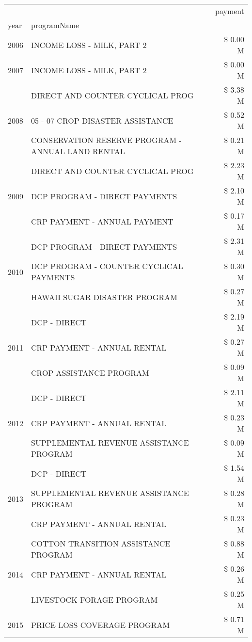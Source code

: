 \begin{tabular}{llr}
\toprule
 &  & payment \\
year & programName &  \\
\midrule
2006 & INCOME LOSS - MILK, PART 2 & \$ 0.00 M \\
\cline{1-3}
2007 & INCOME LOSS - MILK, PART 2 & \$ 0.00 M \\
\cline{1-3}
\multirow[t]{3}{*}{2008} & DIRECT AND COUNTER CYCLICAL PROG & \$ 3.38 M \\
 & 05 - 07 CROP DISASTER ASSISTANCE & \$ 0.52 M \\
 & CONSERVATION RESERVE PROGRAM - ANNUAL LAND RENTAL & \$ 0.21 M \\
\cline{1-3}
\multirow[t]{3}{*}{2009} & DIRECT AND COUNTER CYCLICAL PROG & \$ 2.23 M \\
 & DCP PROGRAM - DIRECT PAYMENTS & \$ 2.10 M \\
 & CRP PAYMENT - ANNUAL PAYMENT & \$ 0.17 M \\
\cline{1-3}
\multirow[t]{3}{*}{2010} & DCP PROGRAM - DIRECT PAYMENTS & \$ 2.31 M \\
 & DCP PROGRAM - COUNTER CYCLICAL PAYMENTS & \$ 0.30 M \\
 & HAWAII SUGAR DISASTER PROGRAM & \$ 0.27 M \\
\cline{1-3}
\multirow[t]{3}{*}{2011} & DCP - DIRECT & \$ 2.19 M \\
 & CRP PAYMENT - ANNUAL RENTAL & \$ 0.27 M \\
 & CROP ASSISTANCE PROGRAM & \$ 0.09 M \\
\cline{1-3}
\multirow[t]{3}{*}{2012} & DCP - DIRECT & \$ 2.11 M \\
 & CRP PAYMENT - ANNUAL RENTAL & \$ 0.23 M \\
 & SUPPLEMENTAL REVENUE ASSISTANCE PROGRAM & \$ 0.09 M \\
\cline{1-3}
\multirow[t]{3}{*}{2013} & DCP - DIRECT & \$ 1.54 M \\
 & SUPPLEMENTAL REVENUE ASSISTANCE PROGRAM & \$ 0.28 M \\
 & CRP PAYMENT - ANNUAL RENTAL & \$ 0.23 M \\
\cline{1-3}
\multirow[t]{3}{*}{2014} & COTTON TRANSITION ASSISTANCE PROGRAM & \$ 0.88 M \\
 & CRP PAYMENT - ANNUAL RENTAL & \$ 0.26 M \\
 & LIVESTOCK FORAGE PROGRAM & \$ 0.25 M \\
\cline{1-3}
\multirow[t]{3}{*}{2015} & PRICE LOSS COVERAGE PROGRAM & \$ 0.71 M \\

\end{tabular}
